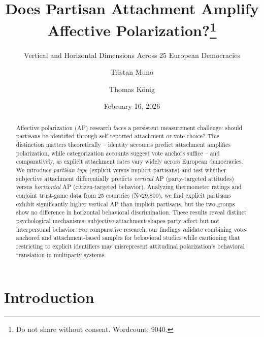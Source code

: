 \documentclass[
  12pt,
  a4paper,
  DIV=11,
  numbers=noendperiod]{scrartcl}
\title{Does Partisan Attachment Amplify Affective
Polarization?\thanks{Do not share without consent. Wordcount: 9040.}}
\subtitle{Vertical and Horizontal Dimensions Across 25 European
Democracies}
\author{Tristan Muno \and Thomas König}
\date{February 16, 2026}
\begin{document}
\maketitle
\begin{abstract}
Affective polarization (AP) research faces a persistent measurement
challenge: should partisans be identified through self-reported
attachment or vote choice? This distinction matters theoretically --
identity accounts predict attachment amplifies polarization, while
categorization accounts suggest vote anchors suffice -- and
comparatively, as explicit attachment rates vary widely across European
democracies. We introduce \emph{partisan type} (explicit versus implicit
partisans) and test whether subjective attachment differentially
predicts \emph{vertical} AP (party-targeted attitudes) versus
\emph{horizontal} AP (citizen-targeted behavior). Analyzing thermometer
ratings and conjoint trust-game data from 25 countries (N≈29,800), we
find explicit partisans exhibit significantly higher vertical AP than
implicit partisans, but the two groups show no difference in horizontal
behavioral discrimination. These results reveal distinct psychological
mechanisms: subjective attachment shapes party affect but not
interpersonal behavior. For comparative research, our findings validate
combining vote-anchored and attachment-based samples for behavioral
studies while cautioning that restricting to explicit identifiers may
misrepresent attitudinal polarization's behavioral translation in
multiparty systems.
\end{abstract}


\section{Introduction}\label{sec-introduction}
\end{document}
